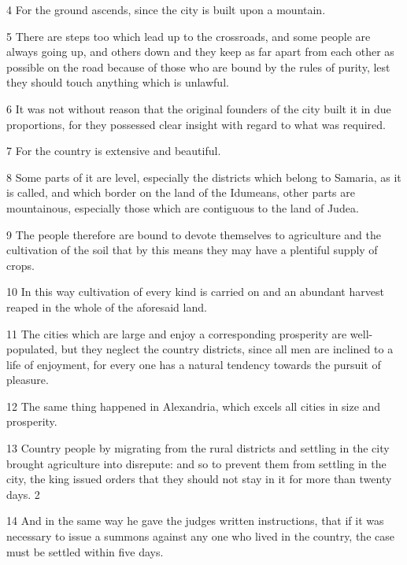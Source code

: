 \par 4 For the ground ascends, since the city is built upon a mountain.

\par 5 There are steps too which lead up to the crossroads, and some people are always going up, and others down and they keep as far apart from each other as possible on the road because of those who are bound by the rules of purity, lest they should touch anything which is unlawful.

\par 6 It was not without reason that the original founders of the city built it in due proportions, for they possessed clear insight with regard to what was required.

\par 7 For the country is extensive and beautiful.

\par 8 Some parts of it are level, especially the districts which belong to Samaria, as it is called, and which border on the land of the Idumeans, other parts are mountainous, especially those which are contiguous to the land of Judea.

\par 9 The people therefore are bound to devote themselves to agriculture and the cultivation of the soil that by this means they may have a plentiful supply of crops.

\par 10 In this way cultivation of every kind is carried on and an abundant harvest reaped in the whole of the aforesaid land.

\par 11 The cities which are large and enjoy a corresponding prosperity are well-populated, but they neglect the country districts, since all men are inclined to a life of enjoyment, for every one has a natural tendency towards the pursuit of pleasure.

\par 12 The same thing happened in Alexandria, which excels all cities in size and prosperity.

\par 13 Country people by migrating from the rural districts and settling in the city brought agriculture into disrepute: and so to prevent them from settling in the city, the king issued orders that they should not stay in it for more than twenty days. 2

\par 14 And in the same way he gave the judges written instructions, that if it was necessary to issue a summons against any one who lived in the country, the case must be settled within five days.

